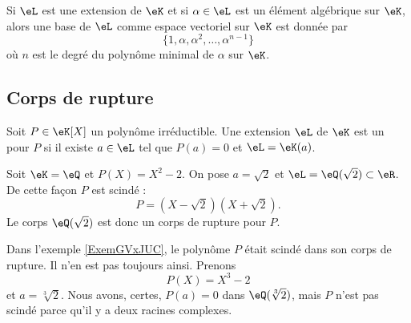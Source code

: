 \begin{proposition}     \label{PropdsRAsk}
    Si \( \eL\) est une extension de \( \eK\) et si \( \alpha\in \eL\) est un élément algébrique sur \( \eK\), alors une base de \( \eL\) comme espace vectoriel sur \( \eK\) est donnée par
    \begin{equation}
        \{ 1,\alpha,\alpha^2,\ldots, \alpha^{n-1} \}
    \end{equation}
    où \( n\) est le degré du polynôme minimal de \( \alpha\) sur \( \eK\).
\end{proposition}

\subsection{Corps de rupture}

\begin{definition}
    Soit \( P\in\eK[X]\) un polynôme irréductible. Une extension \( \eL\) de \( \eK\) est un  pour \( P\) si il existe \( a\in \eL\) tel que \( P(a)=0\) et \( \eL=\eK(a)\).
\end{definition}

\begin{example}     \label{ExemGVxJUC}
    Soit \( \eK=\eQ\) et \( P(X)=X^2-2\). On pose \( a=\sqrt{2}\) et \( \eL=\eQ(\sqrt{2})\subset\eR\). De cette façon \( P\) est scindé :
    \begin{equation}
        P=(X-\sqrt{2})(X+\sqrt{2}).
    \end{equation}
    Le corps \( \eQ(\sqrt{2})\) est donc un corps de rupture pour \( P\).
\end{example}

\begin{example}
    Dans l'exemple \ref{ExemGVxJUC}, le polynôme \( P\) était scindé dans son corps de rupture. Il n'en est pas toujours ainsi. Prenons 
    \begin{equation}
        P(X)=X^3-2
    \end{equation}
    et \( a=\sqrt[3]{2}\). Nous avons, certes, \( P(a)=0\) dans \( \eQ(\sqrt[3]{2})\), mais \( P\) n'est pas scindé parce qu'il y a deux racines complexes.
\end{example}

